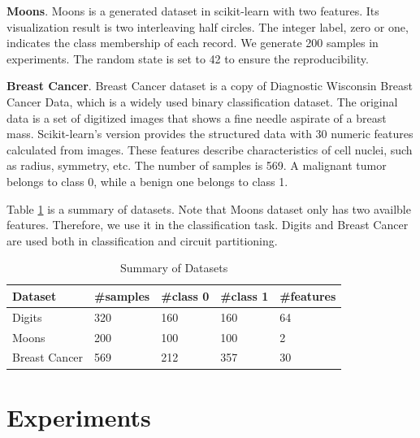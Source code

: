 \documentclass[sigconf]{acmart}
\begin{document}
\vspace{0.2cm}
\noindent\textbf{Moons}. Moons is a generated dataset in scikit-learn with two features. Its visualization result is two interleaving half circles. The integer label, zero or one, indicates the class membership of each record. We generate 200 samples in experiments. The random state is set to 42 to ensure the reproducibility.

\vspace{0.2cm}
\noindent\textbf{Breast Cancer}. Breast Cancer dataset is a copy of Diagnostic Wisconsin Breast Cancer Data, which is a widely used binary classification dataset. The original data is a set of digitized images that shows a fine needle aspirate of a breast mass. Scikit-learn's version provides the structured data with 30 numeric features calculated from images. These features describe characteristics of cell nuclei, such as radius, symmetry, etc. The number of samples is 569. A malignant tumor belongs to class 0, while a benign one belongs to class 1.

\vspace{0.2cm}
Table \ref{tab:datasets} is a summary of datasets. Note that Moons dataset only has two availble features. Therefore, we use it in the classification task. Digits and Breast Cancer are used both in classification and circuit partitioning.

\begin{table}[!ht]
    \centering
    \caption{Summary of Datasets}
    \label{tab:datasets}
    \begin{tabular}{lllll}
        \toprule
        \textbf{Dataset} & \textbf{\#samples} & \textbf{\#class 0} & \textbf{\#class 1} & \textbf{\#features}\\
        \midrule
        Digits & 320 & 160 & 160 & 64\\
        Moons & 200 & 100 & 100 & 2\\
        Breast Cancer & 569 & 212 & 357 & 30\\
        \bottomrule
    \end{tabular}
\end{table}


\section{Experiments}
\end{document}
